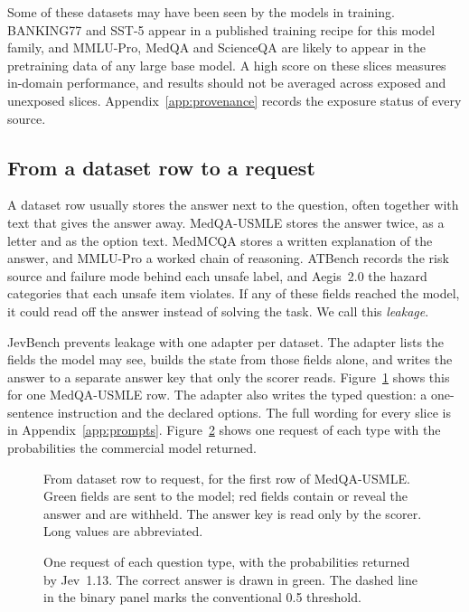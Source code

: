 Some of these datasets may have been seen by the models in training. BANKING77
and SST-5 appear in a published training recipe for this model family, and
MMLU-Pro, MedQA and ScienceQA are likely to appear in the pretraining data of any
large base model. A high score on these slices measures in-domain performance,
and results should not be averaged across exposed and unexposed slices.
Appendix~\ref{app:provenance} records the exposure status of every source.

\subsection{From a dataset row to a request}
\label{sec:adapters}

A dataset row usually stores the answer next to the question, often together
with text that gives the answer away. MedQA-USMLE stores the answer twice, as a
letter and as the option text. MedMCQA stores a written explanation of the
answer, and MMLU-Pro a worked chain of reasoning. ATBench records the risk
source and failure mode behind each unsafe label, and Aegis~2.0 the hazard
categories that each unsafe item violates. If any of these fields reached the
model, it could read off the answer instead of solving the task. We call this
\emph{leakage}.

JevBench prevents leakage with one adapter per dataset. The adapter lists the
fields the model may see, builds the state from those fields alone, and writes
the answer to a separate answer key that only the scorer reads.
Figure~\ref{fig:anatomy} shows this for one MedQA-USMLE row. The adapter also
writes the typed question: a one-sentence instruction and the declared options.
The full wording for every slice is in Appendix~\ref{app:prompts}.
Figure~\ref{fig:types} shows one request of each type with the probabilities the
commercial model returned.

\begin{figure}[t]
\centering

\caption{From dataset row to request, for the first row of MedQA-USMLE. Green
fields are sent to the model; red fields contain or reveal the answer and are
withheld. The answer key is read only by the scorer. Long values are
abbreviated.}
\label{fig:anatomy}
\end{figure}

\begin{figure}[t]
\centering

\caption{One request of each question type, with the probabilities returned by
Jev~1.13. The correct answer is drawn in green. The dashed line in the binary
panel marks the conventional 0.5 threshold.}
\label{fig:types}
\end{figure}

